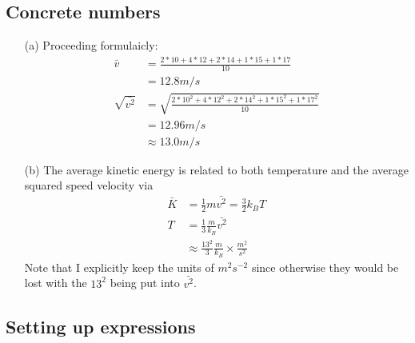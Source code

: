 \documentclass{article}
\begin{document}
\subsection{Concrete numbers}

\begin{itemize}
	\item[(a)] Proceeding formulaicly:
	\begin{align*}
	\bar{v} &= \frac{2*10 + 4*12 + 2*14 + 1*15 + 1*17}{10} \\
	&= 12.8 m/s \\
	\sqrt{\bar{v^2}} &= \sqrt{\frac{2*10^2 + 4*12^2 + 2*14^2 + 1*15^2 + 1*17^2}{10}} \\
	&= 12.96 m/s \\
	&\approx 13.0 m/s
	\end{align*}
	\item[(b)] The average kinetic energy is related to both temperature and the average squared speed velocity via
	\begin{align*}
	\bar{K} &= \frac{1}{2}m\bar{v^2} = \frac{3}{2}k_B T \\
	T &= \frac{1}{3}\frac{m}{k_B}\bar{v^2} \\
	&\approx \frac{13^2}{3}\frac{m}{k_B}\times\frac{m^2}{s^2}
	\end{align*}
	Note that I explicitly keep the units of $m^2 s^{-2}$ since otherwise they would be lost with the $13^2$ being put into $\bar{v^2}$.
\end{itemize}

\subsection{Setting up expressions}
\end{document}
